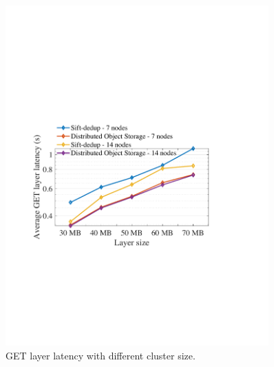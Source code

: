 \begin{figure}[t]
	\centering
	\begin{minipage}{0.3\textwidth}
		\centering
		\includegraphics[width=0.9\textwidth]{graphs/clusterscale.pdf}
		\caption{GET layer latency with different cluster size. 
		 }
		\label{fig:eval-clusterscale}
	\end{minipage}%
	\hspace{1mm}
		\begin{minipage}{0.3\textwidth}
		\centering

\end{minipage}
\end{figure}
